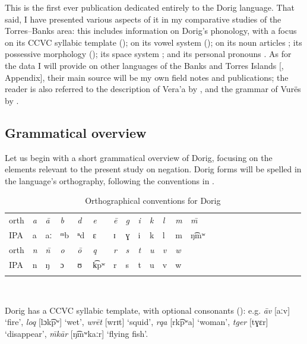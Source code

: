 \documentclass[output=paper,colorlinks,citecolor=brown,draft]{langscibook}
\begin{document}
This is the first ever publication dedicated entirely to the Dorig language. That said, I have presented various aspects of it in my comparative studies of the Torres–Banks area: this includes information on Dorig’s phonology, with a \mbox{focus} on its CCVC syllabic template (\citealt[407–408]{François2010}); on its vowel system (\citealt[461, 491]{François2005a}); on its noun articles \citep{François2007}; its possessive morphology (\citealt[486]{François2005a}); its space system \citep{François2015}; and its personal pronouns \citep{François2016a}. As for the data I will provide on other languages of the Banks and Torres Islands [, Appendix], their main source will be my own field notes and publications; the reader is also referred to the description of Vera’a by \citet{Schnell2011}, and the grammar of Vurës by \citet{Malau2016}.

\subsection{Grammatical overview}\label{sec:dor:1.2}
Let us begin with a short grammatical overview of Dorig, focusing on the \mbox{elements} relevant to the present study on negation. Dorig forms will be spelled in the language’s orthography, following the conventions in . 

\begin{table}\small
\begin{tabularx}{\textwidth}{XXXXXXXXXXXXXXXXXXXXXXXl}
\lsptoprule
orth & {\itshape a} & {\itshape ā} & {\itshape b} & {\itshape d} & {\itshape e} & {\itshape ē} & {\itshape g} & {\itshape i} & {\itshape k} & {\itshape l} & {\itshape m} & \textit{\={m} } \\
IPA & a & aː & ᵐb & ⁿd & ɛ & ɪ & ɣ & i & k & l & m & \mbox{ŋ​͡mʷ} \\
\midrule
orth & \textit{n} & \textit{\={n}} & \textit{o} & \textit{ō} & \textit{q} & \textit{r} & \textit{s} & \textit{t} & \textit{u} & \textit{v} & \textit{w}\\
IPA & n & ŋ & ɔ & ʊ & k͡pʷ & r & s & t & u & v & w\\
\lspbottomrule
\end{tabularx}\\
    \caption{Orthographical conventions for Dorig}
    \label{tab:dor:ortho}
\end{table}

Dorig has a CCVC syllabic template, with optional consonants (\citealt[407]{François2010}): e.g. \textit{āv} [aːv] ‘fire’, \textit{loq} [lɔk​͡pʷ] ‘wet’, \textit{wrēt} [wrɪt] ‘squid’, \textit{rqa} [rk​͡pʷa] ‘woman’, \textit{tger} [tɣɛr] ‘disappear’, \textit{\={m}kār} [ŋ​͡mʷkaːr] ‘flying fish’. 
\end{document}
